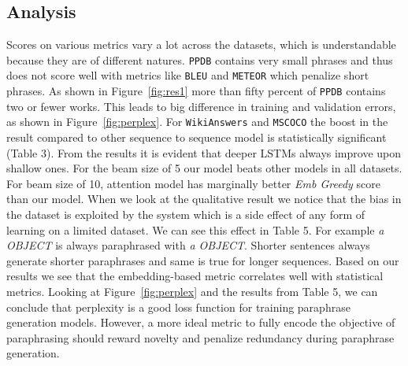  
 
\subsection{Analysis}
\label{sec:length}
    Scores on various metrics vary a lot across the datasets, which is understandable because they are of different natures.  \texttt{PPDB} contains very small phrases and thus does not score well with metrics like \texttt{BLEU} and \texttt{METEOR} which penalize short phrases. As shown in Figure~\ref{fig:res1} more than fifty percent of \texttt{PPDB} contains two or fewer works. This leads to big difference in training and validation errors, as shown in Figure~\ref{fig:perplex}. For \texttt{WikiAnswers} and \texttt{MSCOCO} the boost in the result compared to other sequence to sequence model is statistically significant (Table 3). From the results it is evident that deeper LSTMs always improve upon shallow ones. For the beam size of 5 our model beats other models in all datasets. For beam size of 10, attention model has marginally better \emph{Emb Greedy} score than our model. When we look at the qualitative result we notice that the bias in the dataset is exploited by the system which is a side effect of any form of learning on a limited dataset. We can see this effect in Table 5. For example \emph{a OBJECT} is always paraphrased with \emph{a OBJECT}. Shorter sentences always generate shorter paraphrases and same is true for longer sequences. Based on our results we see that the embedding-based metric correlates well with statistical metrics. Looking at Figure~\ref{fig:perplex} and the results from Table 5, we can conclude that perplexity is a good loss function for training paraphrase generation models. However, a more ideal metric to fully encode the objective of paraphrasing should reward novelty and penalize redundancy during paraphrase generation.
 
 

